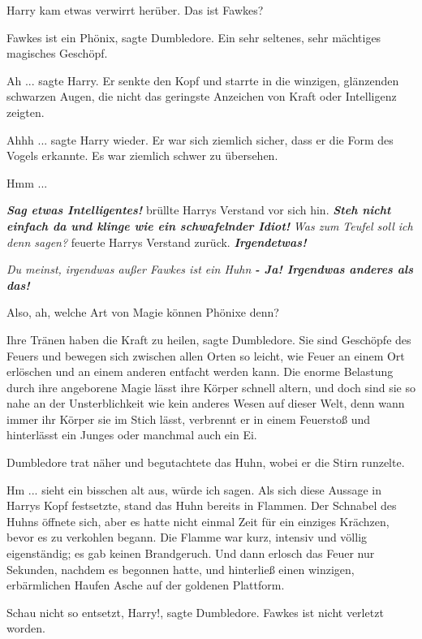 Harry kam etwas verwirrt herüber. \glqq{}Das ist Fawkes?\grqq{}

\glqq{}Fawkes ist ein Phönix\grqq{}, sagte Dumbledore. \glqq{}Ein sehr seltenes,
sehr mächtiges magisches Geschöpf.\grqq{}

\glqq{}Ah ...\grqq{} sagte Harry. Er senkte den Kopf und starrte in die winzigen,
glänzenden schwarzen Augen, die nicht das geringste Anzeichen von Kraft oder
Intelligenz zeigten.

\glqq{}Ahhh ...\grqq{} sagte Harry wieder. Er war sich ziemlich sicher, dass er
die Form des Vogels erkannte. Es war ziemlich schwer zu übersehen.

\glqq{}Hmm ...\grqq{}

\textbf{\emph{Sag etwas Intelligentes!}} brüllte Harrys Verstand vor sich hin.
\textbf{\emph{Steh nicht einfach da und klinge wie ein schwafelnder Idiot!} }
\emph{Was zum Teufel soll ich denn sagen?} feuerte Harrys Verstand zurück.
\textbf{\emph{Irgendetwas!}}

\emph{Du meinst, irgendwas außer \glqq{}Fawkes ist ein Huhn\grqq{}}
\textbf{\emph{- Ja! Irgendwas anderes als das!}}

\glqq{}Also, ah, welche Art von Magie können Phönixe denn?\grqq{}

\glqq{}Ihre Tränen haben die Kraft zu heilen\grqq{}, sagte Dumbledore. \glqq{}Sie
sind Geschöpfe des Feuers und bewegen sich zwischen allen Orten so leicht, wie
Feuer an einem Ort erlöschen und an einem anderen entfacht werden kann. Die
enorme Belastung durch ihre angeborene Magie lässt ihre Körper schnell altern,
und doch sind sie so nahe an der Unsterblichkeit wie kein anderes Wesen auf
dieser Welt, denn wann immer ihr Körper sie im Stich lässt, verbrennt er in
einem Feuerstoß und hinterlässt ein Junges oder manchmal auch ein Ei.\grqq{}

Dumbledore trat näher und begutachtete das Huhn, wobei er die Stirn runzelte.

\glqq{}Hm ... sieht ein bisschen alt aus, würde ich sagen.\grqq{} Als sich diese
Aussage in Harrys Kopf festsetzte, stand das Huhn bereits in Flammen. Der
Schnabel des Huhns öffnete sich, aber es hatte nicht einmal Zeit für ein
einziges Krächzen, bevor es zu verkohlen begann. Die Flamme war kurz, intensiv
und völlig eigenständig; es gab keinen Brandgeruch. Und dann erlosch das Feuer
nur Sekunden, nachdem es begonnen hatte, und hinterließ einen winzigen,
erbärmlichen Haufen Asche auf der goldenen Plattform.

\glqq{}Schau nicht so entsetzt, Harry!\grqq{}, sagte Dumbledore. \glqq{}Fawkes ist
nicht verletzt worden.\grqq{}

